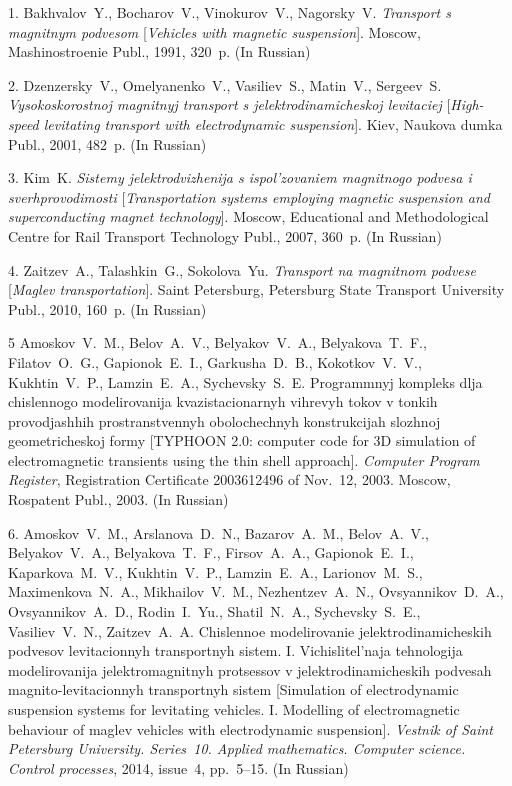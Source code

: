 {\footnotesize

\vskip 3mm


\vskip 2mm


1. Bakhvalov~Y., Bocharov~V., Vinokurov~V., Nagorsky~V. {\it
Transport s magnitnym podvesom} [{\em Vehicles with magnetic
suspension}]. Moscow, Mashinostroenie Publ., 1991, 320~p. (In
Russian)

2. Dzenzersky~V., Omelyanenko~V., Vasiliev~S., Matin~V.,
Sergeev~S. {\it Vysokoskorostnoj magnitnyj transport s
jelektrodinamicheskoj levitaciej} [{\em High-speed levitating
transport with electrodynamic suspension}]. Kiev, Naukova dumka
Publ., 2001, 482~p. (In Russian)

3. Kim~K. {\it Sistemy jelektrodvizhenija s ispol'zovaniem
magnitnogo podvesa i sverhprovodimosti} [{\em Transportation
systems employing magnetic suspension and superconducting magnet
technology}]. Moscow, Educational and Methodological Centre for
Rail Transport Technology Publ.,  2007, 360~p. (In Russian)

4. Zaitzev~A., Talashkin~G., Sokolova~Yu. {\it Transport na
magnitnom podvese} [{\em Maglev transportation}]. Saint
Petersburg, Petersburg State Transport University Publ., 2010,
160~p. (In Russian)

5 Amoskov~V.~M., Belov~A.~V., Belyakov~V.~A., Belyakova~T.~F.,
Filatov~O.~G., Gapionok~E.~I., Garkusha~D.~B., Kokotkov~V.~V.,
Kukhtin~V.~P., Lamzin~E.~A., Sychevsky~S.~E. Programmnyj kompleks
dlja chislennogo modelirovanija kvazistacionarnyh vihrevyh tokov v
tonkih provodjashhih prostranstvennyh obolochechnyh konstrukcijah
slozhnoj geometricheskoj formy [TYPHOON 2.0: computer code for 3D
simulation of electromagnetic transients using the thin shell
approach]. {\em Computer Program Register}, Registration
Certificate 2003612496 of Nov.~12, 2003. Moscow, Rospatent
 Publ., 2003. (In Russian)

6. Amoskov~V.~M., Arslanova~D.~N., Bazarov~A.~M., Belov~A.~V.,
Belyakov~V.~A., Belyakova~T.~F., Firsov~A.~A., Gapionok~E.~I.,
Kaparkova~M.~V., Kukhtin~V.~P., Lamzin~E.~A., Larionov~M.~S.,
Maximenkova~N.~A., Mikhailov~V.~M., Nezhentzev~A.~N.,
Ovsyannikov~D.~A., Ovsyannikov~A.~D., Rodin~I.~Yu., Shatil~N.~A.,
Sychevsky~S.~E., Vasiliev~V.~N., Zaitzev~A.~A. Chislennoe
modelirovanie jelektrodinamicheskih podvesov levitacionnyh
transportnyh sistem. I. Vichislitel'naja tehnologija
modelirovanija jelektromagnitnyh protsessov v
jelektrodinamicheskih podvesah magnito-levitacionnyh transportnyh
sistem [Simulation of electrodynamic suspension systems for
levitating vehicles. I. Modelling of electromagnetic behaviour of
maglev vehicles with electrodynamic suspension]. {\em Vestnik of
Saint Petersburg University. Series~10. Applied mathematics.
Computer science. Control processes}, 2014, issue~4, pp.~5--15.
(In Russian)

}
